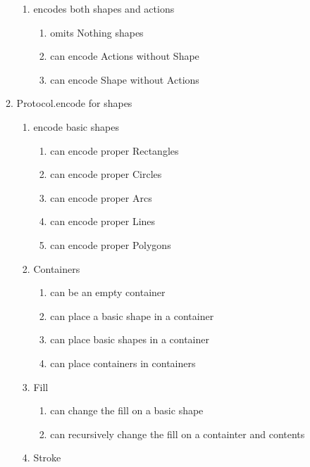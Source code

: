 \begin{enumerate}[{T}1]
\begin{enumerate}
\begin{enumerate}
	        \item encodes both shapes and actions
	        \begin{enumerate}
            	\item omits Nothing shapes
            	\item can encode Actions without Shape
            	\item can encode Shape without Actions
            \end{enumerate}
        \end{enumerate}
	    \item Protocol.encode for shapes
	    \begin{enumerate}
	        \item encode basic shapes
	        \begin{enumerate}
            	\item can encode proper Rectangles
            	\item can encode proper Circles
            	\item can encode proper Arcs
            	\item can encode proper Lines
            	\item can encode proper Polygons
            \end{enumerate}
	        \item Containers
	        \begin{enumerate}
            	\item can be an empty container
            	\item can place a basic shape in a container
            	\item can place basic shapes in a container
            	\item can place containers in containers
            \end{enumerate}
	        \item Fill
	        \begin{enumerate}
            	\item can change the fill on a basic shape
            	\item can recursively change the fill on a containter and contents
            \end{enumerate}
	        \item Stroke

\end{enumerate}
\end{enumerate}
\end{enumerate}
